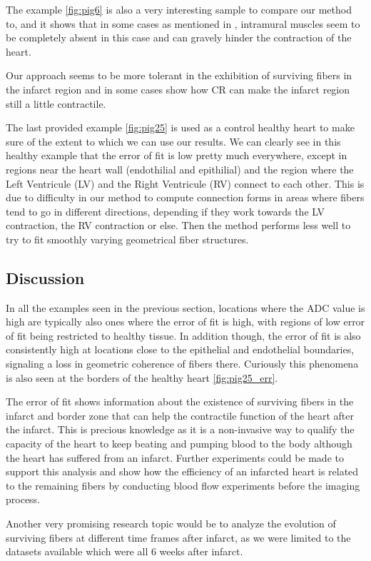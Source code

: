 The example \ref{fig:pig6} is also a very interesting sample to compare our method to, and it shows that in some cases as mentioned in \cite{ursell1985structural}, intramural muscles seem to be completely absent in this case and can gravely hinder the contraction of the heart.

Our approach seems to be more tolerant in the exhibition of surviving fibers in the infarct region and in some cases show how CR can make the infarct region still a little contractile.

The last provided example \ref{fig:pig25} is used as a control healthy heart to make sure of the extent to which we can use our results. We can clearly see in this healthy example that the error of fit is low pretty much everywhere, except in regions near the heart wall (endothilial and epithilial) and the region where the Left Ventricule (LV) and the Right Ventricule (RV) connect to each other. This is due to difficulty in our method to compute connection forms in areas where fibers tend to go in different directions, depending if they work towards the LV contraction, the RV contraction or else. Then the method performs less well to try to fit smoothly varying geometrical fiber structures.

\subsection{Discussion}

In all the examples seen in the previous section, locations where the ADC value is high are typically also ones where the error of fit is high, with regions of low error of fit being restricted to healthy tissue. In addition though, the error of fit is also consistently high at locations close to the epithelial and endothelial boundaries, signaling a loss in geometric coherence of fibers there. Curiously this phenomena is also seen at the borders of the healthy heart \ref{fig:pig25_err}.

The error of fit shows information about the existence of surviving fibers in the infarct and border zone that can help the contractile function of the heart after the infarct. This is precious knowledge as it is a non-invasive way to qualify the capacity of the heart to keep beating and pumping blood to the body although the heart has suffered from an infarct. Further experiments could be made to support this analysis and show how the efficiency of an infarcted heart is related to the remaining fibers by conducting blood flow experiments before the imaging process.

Another very promising research topic would be to analyze the evolution of surviving fibers at different time frames after infarct, as we were limited to the datasets available which were all 6 weeks after infarct.
